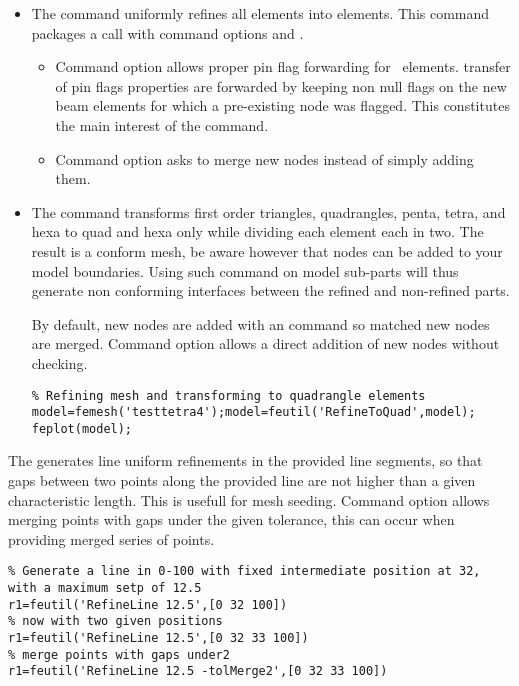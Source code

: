 \begin{itemize}
\item The  command uniformly refines all \beam elements into  elements. This command packages a  call with command options  and . 
\begin{itemize}
\item Command option  allows proper pin flag forwarding for \beam\ elements. transfer of pin flags properties are forwarded by keeping non null flags on the new beam elements for which a pre-existing node was flagged. This constitutes the main interest of the command.
\item Command option  asks to merge new nodes instead of simply adding them.
\end{itemize}

\item The   command transforms first order triangles, quadrangles, penta, tetra, and hexa to quad and hexa only while dividing each element each in two. The result is a conform mesh, be aware however that nodes can be added to your model boundaries. Using such command on model sub-parts will thus generate non conforming interfaces between the refined and non-refined parts.

By default, new nodes are added with an  command so matched new nodes are merged. Command option  allows a direct addition of new nodes without checking.

\begin{verbatim}
% Refining mesh and transforming to quadrangle elements
model=femesh('testtetra4');model=feutil('RefineToQuad',model);
feplot(model);
\end{verbatim}%

\end{itemize}


The  generates line uniform refinements in the provided line segments, so that gaps between two points along the provided line are not higher than a given characteristic length. This is usefull for mesh seeding.
Command option  allows merging points with gaps under the given tolerance, this can occur when providing merged series of points.

\begin{verbatim}
% Generate a line in 0-100 with fixed intermediate position at 32, with a maximum setp of 12.5
r1=feutil('RefineLine 12.5',[0 32 100])
% now with two given positions
r1=feutil('RefineLine 12.5',[0 32 33 100])
% merge points with gaps under2
r1=feutil('RefineLine 12.5 -tolMerge2',[0 32 33 100])
\end{verbatim}

